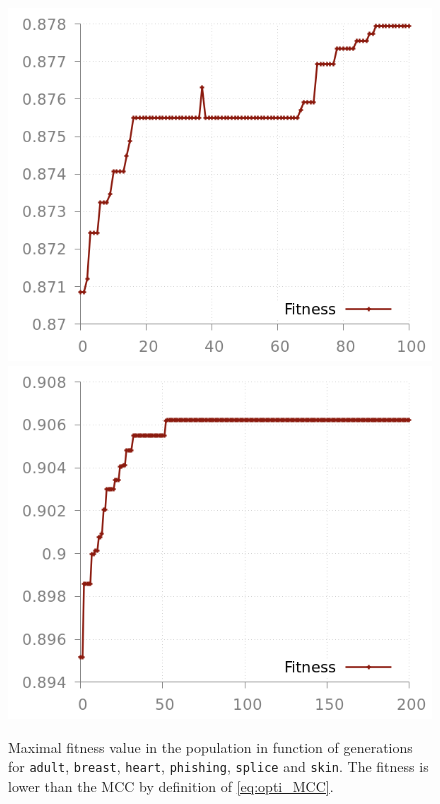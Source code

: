 \documentclass[preprint,12pt]{elsarticle}
\theoremstyle{definition}
\begin{document}
\begin{figure}[!h]
\hfill
\includegraphics[scale=0.2]{img/fitness_mcc_phishing.png}
\hfill
\includegraphics[scale=0.2]{img/fitness_mcc_splice.png}
\caption{Maximal fitness value in the population in function of generations for \texttt{adult}, \texttt{breast},  \texttt{heart},  \texttt{phishing},  \texttt{splice} and  \texttt{skin}. The fitness is lower than the MCC by definition of \eqref{eq:opti_MCC}.}
\label{fig:fitness}
\end{figure}
\end{document}
